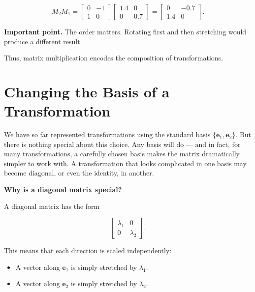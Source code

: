 \documentclass[11pt,openany]{book}
\theoremstyle{definition}
\begin{document}
\[
M_2 M_1 =
\begin{bmatrix}
0 & -1 \\
1 & 0
\end{bmatrix}
\begin{bmatrix}
1.4 & 0 \\
0 & 0.7
\end{bmatrix}
=
\begin{bmatrix}
0 & -0.7 \\
1.4 & 0
\end{bmatrix}.
\]

\medskip

\textbf{Important point.} The order matters. Rotating first and then stretching would produce
a different result.

\medskip

Thus, matrix multiplication encodes the composition of transformations.

\section{Changing the Basis of a Transformation}

We have so far represented transformations using the standard basis
$\{\mathbf{e}_1, \mathbf{e}_2\}$. But there is nothing special about this choice.
Any basis will do --- and in fact, for many transformations, a carefully chosen basis
makes the matrix dramatically simpler to work with. A transformation that looks complicated
in one basis may become diagonal, or even the identity, in another.

\medskip

\medskip

\textbf{Why is a diagonal matrix special?}

\medskip

A diagonal matrix has the form

\[
\begin{bmatrix}
\lambda_1 & 0 \\
0 & \lambda_2
\end{bmatrix}.
\]

\medskip

This means that each direction is scaled independently:

\begin{itemize}
  \item A vector along $\mathbf{e}_1$ is simply stretched by $\lambda_1$.
  \item A vector along $\mathbf{e}_2$ is simply stretched by $\lambda_2$.
\end{itemize}
\end{document}
